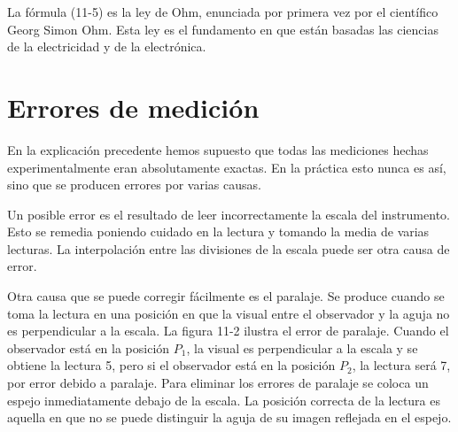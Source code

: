 \documentclass[12pt]{article}
\begin{document}
La fórmula (11-5) es la ley de Ohm, enunciada por primera vez por el científico Georg Simon Ohm. Esta ley es el fundamento en que están basadas las ciencias de la electricidad y de la electrónica.

\section{Errores de medición}
En la explicación precedente hemos supuesto que todas las mediciones hechas experimentalmente eran absolutamente exactas. En la práctica esto nunca es así, sino que se producen errores por varias causas.

Un posible error es el resultado de leer incorrectamente la escala del instrumento. Esto se remedia poniendo cuidado en la lectura y tomando la media de varias lecturas. La interpolación entre las divisiones de la escala puede ser otra causa de error.

Otra causa que se puede corregir fácilmente es el paralaje. Se produce cuando se toma la lectura en una posición en que la visual entre el observador y la aguja no es perpendicular a la escala. La figura 11-2 ilustra el error de paralaje. Cuando el observador está en la posición \( P_1 \), la visual es perpendicular a la escala y se obtiene la lectura 5, pero si el observador está en la posición \( P_2 \), la lectura será 7, por error debido a paralaje. Para eliminar los errores de paralaje se coloca un espejo inmediatamente debajo de la escala. La posición correcta de la lectura es aquella en que no se puede distinguir la aguja de su imagen reflejada en el espejo.
\end{document}
